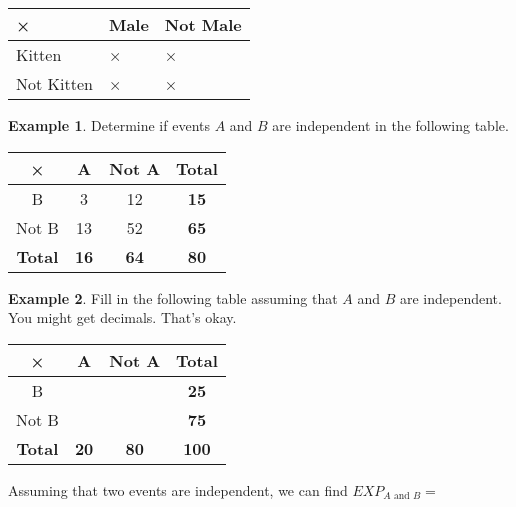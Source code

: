 \documentclass[12pt]{amsart}
\theoremstyle{definition}
\newtheorem{ex}{Example}
\begin{document}
\vspace{.2in}

\begin{center}
\begin{tabular}{l|l|l|}
× & Male & Not Male\\\hline
Kitten & × & ×\\\hline
Not Kitten & × & ×\\\hline
\end{tabular}
\end{center}

\vspace{2in}

\begin{ex} Determine if events $A$ and $B$ are independent in the following table.\end{ex}

\begin{center}
\begin{tabular}{c|c|c|c}
× & A & Not A & \textbf{Total}\\\hline
B & 3 & 12 & \textbf{15}\\\hline
Not B & 13 & 52 & \textbf{65}\\\hline
\textbf{Total} & \textbf{16} & \textbf{64} & \textbf{80}
\end{tabular}
\end{center}

\vfill
\newpage

\begin{ex} Fill in the following table assuming that $A$ and $B$ are independent. You might get decimals. That's okay.\end{ex}

\begin{center}
\begin{tabular}{c|c|c|c}
× & A & Not A & \textbf{Total}\\\hline
B &  &  & \textbf{25}\\\hline
Not B &  &  & \textbf{75}\\\hline
\textbf{Total} & \textbf{20} & \textbf{80} & \textbf{100}
\end{tabular}
\end{center}

\vfill

\begin{framed}
 Assuming that two events are independent, we can find $EXP_{A\text{ and }B}=$
 \vspace{0.1in}
\end{framed}
\end{document}
